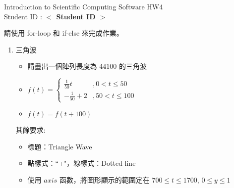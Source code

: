 \documentclass[12pt,a4paper]{article}
\newcommand{\placeholder}[1]{\textbf{$<$ #1 $>$}}
\newcommand{\idnumber}{\placeholder{Student ID}}
\begin{document}
\begin{CJK}{UTF8}{bsmi}
\begin{flushleft}Introduction to Scientific Computing Software HW4
\\Student ID : \idnumber{}\end{flushleft}

請使用 for-loop 和 if-else 來完成作業。
\begin{enumerate}
\item 三角波
\begin{itemize} 
\item 請畫出一個陣列長度為 44100 的三角波

\item $f(t)=\left\{\begin{array}{lc}\frac{1}{50}t&,0 < t\le50 \\ -\frac{1}{50}+2 &,50 < t \le 100\end{array}\right.$
\item $f(t)=f(t+100)$
\end{itemize}
其餘要求:
\begin{itemize}
\item 標題：Triangle Wave
\item 點樣式：``+"，線樣式：Dotted line
\item 使用 $axis$ 函數，將圖形顯示的範圍定在 $700 \le t \le 1700$, $0\le y \le 1$
\end{itemize}
\end{enumerate}
\end{CJK}
\end{document}
